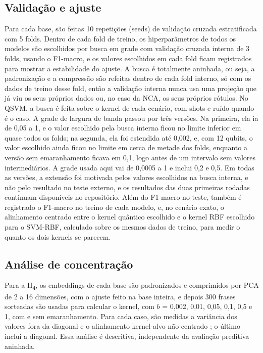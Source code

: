 \documentclass[conference]{IEEEtran}
\newcommand{\svm}{\mbox{SVM-RBF}}
\begin{document}
\subsection{Validação e ajuste}
\label{sec:validacao}
Para cada base, são feitas 10 repetições (seeds) de validação cruzada estratificada com 5 folds. Dentro de cada fold de treino, os hiperparâmetros de todos os modelos são escolhidos por busca em grade com validação cruzada interna de 3 folds, usando o F1-macro, e os valores escolhidos em cada fold ficam registrados para mostrar a estabilidade do ajuste. A busca é totalmente aninhada, ou seja, a padronização e a compressão são refeitas dentro de cada fold interno, só com os dados de treino desse fold, então a validação interna nunca usa uma projeção que já viu os seus próprios dados ou, no caso da NCA, os seus próprios rótulos. No QSVM, a busca é feita sobre o kernel de cada cenário, com shots e ruído quando é o caso. A grade de largura de banda passou por três versões. Na primeira, ela ia de 0,05 a 1, e o valor escolhido pela busca interna ficou no limite inferior em quase todos os folds; na segunda, ela foi estendida até 0,002, e, com 12 qubits, o valor escolhido ainda ficou no limite em cerca de metade dos folds, enquanto a versão sem emaranhamento ficava em 0,1, logo antes de um intervalo sem valores intermediários. A grade usada aqui vai de 0,0005 a 1 e inclui 0,2 e 0,5. Em todas as versões, a extensão foi motivada pelos valores escolhidos na busca interna, e não pelo resultado no teste externo, e os resultados das duas primeiras rodadas continuam disponíveis no repositório. Além do F1-macro no teste, também é registrado o F1-macro no treino de cada modelo, e, no cenário exato, o alinhamento centrado \cite{cortes2012} entre o kernel quântico escolhido e o kernel RBF escolhido para o \svm{}, calculado sobre os mesmos dados de treino, para medir o quanto os dois kernels se parecem.

\subsection{Análise de concentração}
Para a H\textsubscript{4}, os embeddings de cada base são padronizados e comprimidos por PCA de 2 a 16 dimensões, com o ajuste feito na base inteira, e depois 300 frases sorteadas são usadas para calcular o kernel, com $b$ = 0,002, 0,01, 0,05, 0,1, 0,5 e 1, com e sem emaranhamento. Para cada caso, são medidas a variância dos valores fora da diagonal e o alinhamento kernel-alvo não centrado \cite{cristianini2001}; o último inclui a diagonal. Essa análise é descritiva, independente da avaliação preditiva aninhada.
\end{document}
